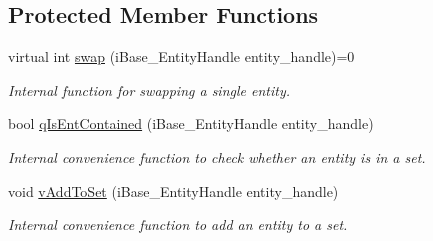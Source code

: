 \subsection*{Protected Member Functions}
\begin{DoxyCompactItemize}
\item 
\hypertarget{class_i_t_a_p_s___swap_1_1_swap_a4a68c5ddcc730223474184c388f59877}{
virtual int \hyperlink{class_i_t_a_p_s___swap_1_1_swap_a4a68c5ddcc730223474184c388f59877}{swap} (iBase\_\-EntityHandle entity\_\-handle)=0}
\label{class_i_t_a_p_s___swap_1_1_swap_a4a68c5ddcc730223474184c388f59877}

\begin{DoxyCompactList}\small\item\em Internal function for swapping a single entity. \item\end{DoxyCompactList}\item 
\hypertarget{class_i_t_a_p_s___swap_1_1_swap_a221c0d60ad88953d9347e0d3558864b6}{
bool \hyperlink{class_i_t_a_p_s___swap_1_1_swap_a221c0d60ad88953d9347e0d3558864b6}{qIsEntContained} (iBase\_\-EntityHandle entity\_\-handle)}
\label{class_i_t_a_p_s___swap_1_1_swap_a221c0d60ad88953d9347e0d3558864b6}

\begin{DoxyCompactList}\small\item\em Internal convenience function to check whether an entity is in a set. \item\end{DoxyCompactList}\item 
\hypertarget{class_i_t_a_p_s___swap_1_1_swap_ab5651c14ff282a14410932ed94fafbb2}{
void \hyperlink{class_i_t_a_p_s___swap_1_1_swap_ab5651c14ff282a14410932ed94fafbb2}{vAddToSet} (iBase\_\-EntityHandle entity\_\-handle)}
\label{class_i_t_a_p_s___swap_1_1_swap_ab5651c14ff282a14410932ed94fafbb2}

\begin{DoxyCompactList}\small\item\em Internal convenience function to add an entity to a set. \item\end{DoxyCompactList}\end{DoxyCompactItemize}
